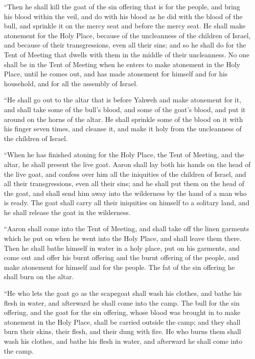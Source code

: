  ``Then he shall kill the goat of the sin offering that
is for the people, and bring his blood within the veil, and do with his
blood as he did with the blood of the bull, and sprinkle it on the mercy
seat and before the mercy seat.  He shall make atonement
for the Holy Place, because of the uncleanness of the children of
Israel, and because of their transgressions, even all their sins; and so
he shall do for the Tent of Meeting that dwells with them in the middle
of their uncleanness.  No one shall be in the Tent of
Meeting when he enters to make atonement in the Holy Place, until he
comes out, and has made atonement for himself and for his household, and
for all the assembly of Israel.

 ``He shall go out to the altar that is before Yahweh and
make atonement for it, and shall take some of the bull's blood, and some
of the goat's blood, and put it around on the horns of the altar.
 He shall sprinkle some of the blood on it with his
finger seven times, and cleanse it, and make it holy from the
uncleanness of the children of Israel.

 ``When he has finished atoning for the Holy Place, the
Tent of Meeting, and the altar, he shall present the live goat.
 Aaron shall lay both his hands on the head of the live
goat, and confess over him all the iniquities of the children of Israel,
and all their transgressions, even all their sins; and he shall put them
on the head of the goat, and shall send him away into the wilderness by
the hand of a man who is ready.  The goat shall carry all
their iniquities on himself to a solitary land, and he shall release the
goat in the wilderness.

 ``Aaron shall come into the Tent of Meeting, and shall
take off the linen garments which he put on when he went into the Holy
Place, and shall leave them there.  Then he shall bathe
himself in water in a holy place, put on his garments, and come out and
offer his burnt offering and the burnt offering of the people, and make
atonement for himself and for the people.  The fat of the
sin offering he shall burn on the altar.

 ``He who lets the goat go as the scapegoat shall wash
his clothes, and bathe his flesh in water, and afterward he shall come
into the camp.  The bull for the sin offering, and the
goat for the sin offering, whose blood was brought in to make atonement
in the Holy Place, shall be carried outside the camp; and they shall
burn their skins, their flesh, and their dung with fire. 
He who burns them shall wash his clothes, and bathe his flesh in water,
and afterward he shall come into the camp.

